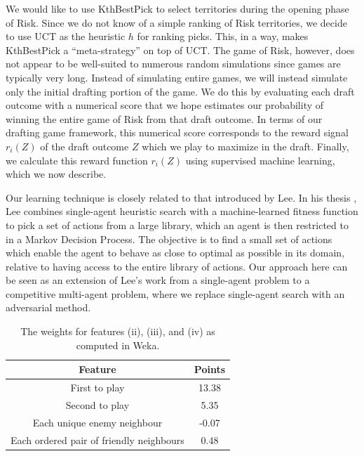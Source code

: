 \documentclass[letterpaper]{article}
\numberwithin{equation}{section}
\numberwithin{theorem}{section}
\numberwithin{lemma}{section}
\numberwithin{df}{section}
\begin{document}
We would like to use KthBestPick to select territories during the opening phase of Risk.  Since we do not know of a simple ranking of Risk territories, we decide to use UCT as the heuristic $h$ for ranking picks.  This, in a way, makes KthBestPick a ``meta-strategy'' on top of UCT.  The game of Risk, however, does not appear to be well-suited to numerous random simulations since games are typically very long.  Instead of simulating entire games, we will instead simulate only the initial drafting portion of the game.  We do this by evaluating each draft outcome with a numerical score that we hope estimates our probability of winning the entire game of Risk from that draft outcome.  In terms of our drafting game framework, this numerical score corresponds to the reward signal $r_i(Z)$ of the draft outcome $Z$ which we play to maximize in the draft.  Finally, we calculate this reward function $r_i(Z)$ using supervised machine learning, which we now describe.

Our learning technique is closely related to that introduced by Lee.  In his thesis \cite{GregLeeThesis}, Lee combines single-agent heuristic search with a machine-learned fitness function to pick a set of actions from a large library, which an agent is then restricted to in a Markov Decision Process.  The objective is to find a small set of actions which enable the agent to behave as close to optimal as possible in its domain, relative to having access to the entire library of actions.  Our approach here can be seen as an extension of Lee's work from a single-agent problem to a competitive multi-agent problem, where we replace single-agent search with an adversarial method. 

\begin{table}[t]
	\centering
		\caption{The weights for features (ii), (iii), and (iv) as computed in Weka.} 
		\label{tab:MoreScoring}
		\begin{footnotesize}
		\begin{tabular}{|c|c|}
			\hline
			\textbf{Feature} & \textbf{Points} \\
			\hline
			First to play & 13.38 \\
			\hline
			Second to play & 5.35 \\
			\hline
			Each unique enemy neighbour & -0.07 \\
			\hline
			Each ordered pair of friendly neighbours & 0.48 \\
			\hline
		\end{tabular}
		\end{footnotesize}
	
\end{table}
\end{document}
